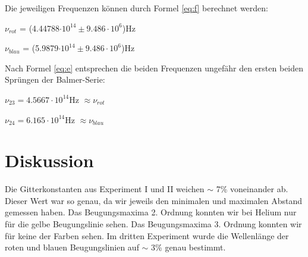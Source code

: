 \documentclass[12pt,a4paper]{article}
\begin{document}
\vspace{5pt}
Die jeweiligen Frequenzen k\"onnen durch Formel \ref{eq:f} berechnet werden:\vspace{5pt}

$\nu_{rot}$ = (4.44788$\cdot 10^{14} \pm 9.486 \cdot 10^6$)Hz

$\nu_{blau}$ = (5.9879$\cdot 10^{14} \pm 9.486 \cdot 10^6$)Hz

\vspace{5pt}
Nach Formel \ref{eq:e} entsprechen die beiden Frequenzen ungef\"ahr den ersten beiden Spr\"ungen der Balmer-Serie:\vspace{5pt}

$\nu_{23} = 4.5667\cdot 10^{14}$Hz $\approx\nu_{rot}$

$\nu_{24} = 6.165\cdot 10^{14}$Hz $\approx\nu_{blau}$


\section*{Diskussion}
Die Gitterkonstanten aus Experiment I und II weichen $\sim$  7\% voneinander ab. Dieser Wert war so genau, da wir jeweils den minimalen und maximalen Abstand gemessen haben. Das Beugungsmaxima 2. Ordnung konnten wir bei Helium nur f\"ur die gelbe Beugungslinie sehen. Das Beugungsmaxima 3. Ordnung konnten wir f\"ur keine der Farben sehen.
Im dritten Experiment wurde die Wellenl\"ange der roten und blauen Beugungslinien auf $\sim$ 3\% genau bestimmt.
\end{document}
